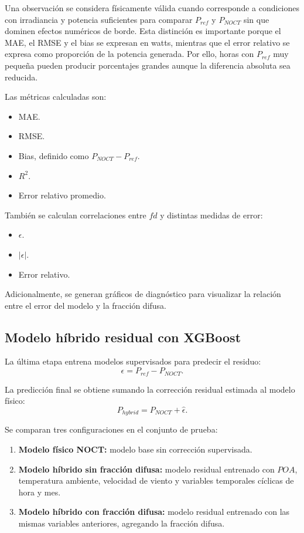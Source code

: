 \documentclass[12pt, letterpaper]{article}
\begin{document}
Una observaci\'on se considera f\'isicamente v\'alida cuando corresponde a condiciones con irradiancia y potencia suficientes para comparar \(P_{ref}\) y \(P_{NOCT}\) sin que dominen efectos num\'ericos de borde. Esta distinci\'on es importante porque el MAE, el RMSE y el bias se expresan en watts, mientras que el error relativo se expresa como proporci\'on de la potencia generada. Por ello, horas con \(P_{ref}\) muy peque\~na pueden producir porcentajes grandes aunque la diferencia absoluta sea reducida.

Las m\'etricas calculadas son:

\begin{itemize}
    \item MAE.
    \item RMSE.
    \item Bias, definido como \(P_{NOCT} - P_{ref}\).
    \item \(R^2\).
    \item Error relativo promedio.
\end{itemize}

Tambi\'en se calculan correlaciones entre \(fd\) y distintas medidas de error:

\begin{itemize}
    \item \(\epsilon\).
    \item \(|\epsilon|\).
    \item Error relativo.
\end{itemize}

Adicionalmente, se generan gr\'aficos de diagn\'ostico para visualizar la relaci\'on entre el error del modelo y la fracci\'on difusa.

\subsection{Modelo h\'ibrido residual con XGBoost}

La \'ultima etapa entrena modelos supervisados para predecir el residuo:
\[
    \epsilon = P_{ref} - P_{NOCT}.
\]

La predicci\'on final se obtiene sumando la correcci\'on residual estimada al modelo f\'isico:
\[
    P_{hybrid} = P_{NOCT} + \widehat{\epsilon}.
\]

Se comparan tres configuraciones en el conjunto de prueba:

\begin{enumerate}
    \item \textbf{Modelo f\'isico NOCT:} modelo base sin correcci\'on supervisada.
    \item \textbf{Modelo h\'ibrido sin fracci\'on difusa:} modelo residual entrenado con \(POA\), temperatura ambiente, velocidad de viento y variables temporales c\'iclicas de hora y mes.
    \item \textbf{Modelo h\'ibrido con fracci\'on difusa:} modelo residual entrenado con las mismas variables anteriores, agregando la fracci\'on difusa.
\end{enumerate}
\end{document}
